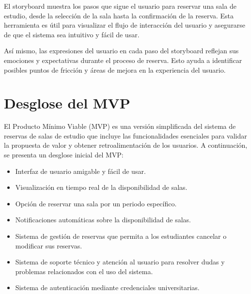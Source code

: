 \documentclass{article}
\begin{document}
      El storyboard muestra los pasos que sigue el usuario para reservar una sala de estudio, desde la selección de la sala hasta la confirmación de la reserva. Esta herramienta es útil para visualizar el flujo de interacción del usuario y asegurarse de que el sistema sea intuitivo y fácil de usar.

      Así mismo, las expresiones del usuario en cada paso del storyboard reflejan sus emociones y expectativas durante el proceso de reserva. Esto ayuda a identificar posibles puntos de fricción y áreas de mejora en la experiencia del usuario.
      \newpage

      \section{Desglose del MVP}

      El Producto Mínimo Viable (MVP) es una versión simplificada del sistema de reservas de salas de estudio que incluye las funcionalidades esenciales para validar la propuesta de valor y obtener retroalimentación de los usuarios. A continuación, se presenta un desglose inicial del MVP:

      \begin{itemize}
        \item Interfaz de usuario amigable y fácil de usar.
        \item Visualización en tiempo real de la disponibilidad de salas.
        \item Opción de reservar una sala por un periodo específico.
        \item Notificaciones automáticas sobre la disponibilidad de salas.
        \item Sistema de gestión de reservas que permita a los estudiantes cancelar o modificar sus reservas.
        \item Sistema de soporte técnico y atención al usuario para resolver dudas y problemas relacionados con el uso del sistema.
        \item Sistema de autenticación mediante credenciales universitarias.
      \end{itemize}
\end{document}
